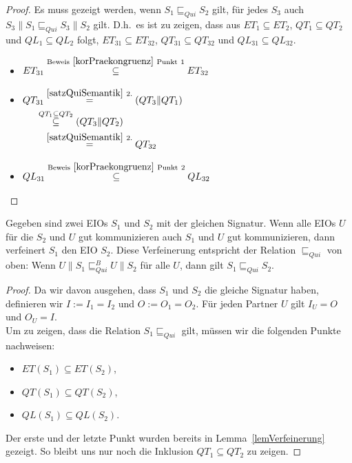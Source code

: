 \begin{proof}
  Es muss gezeigt werden, wenn $S_1\sqsubseteq _{Qui} S_2$ gilt,  für   jedes $
  S_3$ auch $S_3\|S_1\sqsubseteq _{Qui} S_3\|S_2$ gilt. D.h.\ es ist zu zeigen,
  dass aus $ET_1\subseteq ET_2$, $QT_1\subseteq QT_2$ und $QL_1\subseteq QL_2$
  folgt, $ET_{31}\subseteq ET_{32}$, $QT_{31}\subseteq QT_{32}$ und
  $QL_{31}\subseteq QL_{32}$.
  \begin{itemize}
    \item $\begin{aligned}[t]
        ET_{31} \overset{\mathrm{Beweis}~\ref{korPraekongruenz}
        ~\mathrm{Punkt}~1}{\subseteq} ET_{32}
    \end{aligned}$
    \item $\begin{aligned}[t]
        QT_{31} &\overset{\ref{satzQuiSemantik}~2.}{=} (QT_3\|QT_1)\\
                &\hspace{-0.3cm}\overset{QT_1\subseteq QT_2}{\subseteq} (QT_3\|QT_2)\\
                &\overset{\ref{satzQuiSemantik}~2.}{=} QT_{32}
    \end{aligned}$
    \item $\begin{aligned}[t]
        QL_{31} \overset{\mathrm{Beweis}~\ref{korPraekongruenz}
        ~\mathrm{Punkt}~2}{\subseteq} QL_{32}
    \end{aligned}$
  \end{itemize}
\end{proof}

\begin{lem}
  Gegeben sind zwei EIOs $S_1$ und $S_2$ mit der gleichen Signatur. Wenn alle
  EIOs $U$ für die $S_2$ und $U$ gut kommunizieren auch $S_1$ und $U$ gut
  kommunizieren, dann verfeinert $S_1$ den EIO $S_2$. Diese Verfeinerung
  entspricht der Relation $\sqsubseteq _{Qui}$ von oben: Wenn
  $U\|S_1\sqsubseteq _{Qui}^B U\|S_2$ für alle $U$, dann gilt $S_1\sqsubseteq
  _{Qui} S_2$.
\end{lem}

\begin{proof}
  Da wir davon ausgehen, dass $S_1$ und $S_2$ die gleiche Signatur haben,
  definieren wir $I:=I_1=I_2$ und $O:=O_1=O_2$. Für jeden Partner $U$ gilt
  $I_U=O$ und $O_U=I$.\\
  Um zu zeigen, dass die Relation $S_1\sqsubseteq _{Qui}$ gilt, müssen wir die
  folgenden Punkte nachweisen:
  \begin{itemize}
    \item $ET(S_1)\subseteq ET(S_2)$,
    \item $QT(S_1)\subseteq QT(S_2)$,
    \item $QL(S_1)\subseteq QL(S_2)$.
  \end{itemize}
  Der erste und der letzte Punkt wurden bereits in Lemma~\ref{lemVerfeinerung}
  gezeigt. So bleibt uns nur noch die Inklusion $QT_1\subseteq QT_2$ zu zeigen.
\end{proof}
